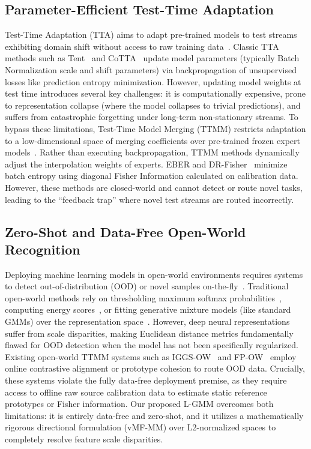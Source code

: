 \documentclass{article}
\theoremstyle{plain}
\theoremstyle{definition}
\theoremstyle{remark}
\begin{document}
\subsection{Parameter-Efficient Test-Time Adaptation}
Test-Time Adaptation (TTA) aims to adapt pre-trained models to test streams exhibiting domain shift without access to raw training data~\cite{wang21, zhang22}. Classic TTA methods such as Tent~\cite{wang21} and CoTTA~\cite{wang22ctta} update model parameters (typically Batch Normalization scale and shift parameters) via backpropagation of unsupervised losses like prediction entropy minimization. However, updating model weights at test time introduces several key challenges: it is computationally expensive, prone to representation collapse (where the model collapses to trivial predictions), and suffers from catastrophic forgetting under long-term non-stationary streams. 
To bypass these limitations, Test-Time Model Merging (TTMM) restricts adaptation to a low-dimensional space of merging coefficients over pre-trained frozen expert models~\cite{yang24, hubotter25}. Rather than executing backpropagation, TTMM methods dynamically adjust the interpolation weights of experts. EBER and DR-Fisher~\cite{zhao24} minimize batch entropy using diagonal Fisher Information calculated on calibration data. However, these methods are closed-world and cannot detect or route novel tasks, leading to the ``feedback trap'' where novel test streams are routed incorrectly.

\subsection{Zero-Shot and Data-Free Open-World Recognition}
Deploying machine learning models in open-world environments requires systems to detect out-of-distribution (OOD) or novel samples on-the-fly~\cite{liang21, hendrycks17}. Traditional open-world methods rely on thresholding maximum softmax probabilities~\cite{hendrycks17}, computing energy scores~\cite{liu20}, or fitting generative mixture models (like standard GMMs) over the representation space~\cite{lee18}. However, deep neural representations suffer from scale disparities, making Euclidean distance metrics fundamentally flawed for OOD detection when the model has not been specifically regularized.
Existing open-world TTMM systems such as IGGS-OW~\cite{hubotter25} and FP-OW~\cite{luan26} employ online contrastive alignment or prototype cohesion to route OOD data. Crucially, these systems violate the fully data-free deployment premise, as they require access to offline raw source calibration data to estimate static reference prototypes or Fisher information. Our proposed L-GMM overcomes both limitations: it is entirely data-free and zero-shot, and it utilizes a mathematically rigorous directional formulation (vMF-MM) over L2-normalized spaces to completely resolve feature scale disparities.
\end{document}
